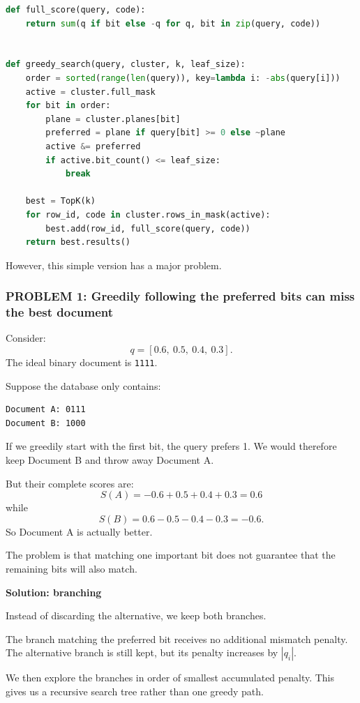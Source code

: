 \begin{minipage}{\linewidth}
\begin{lstlisting}[language=Python]
def full_score(query, code):
    return sum(q if bit else -q for q, bit in zip(query, code))


def greedy_search(query, cluster, k, leaf_size):
    order = sorted(range(len(query)), key=lambda i: -abs(query[i]))
    active = cluster.full_mask
    for bit in order:
        plane = cluster.planes[bit]
        preferred = plane if query[bit] >= 0 else ~plane
        active &= preferred
        if active.bit_count() <= leaf_size:
            break

    best = TopK(k)
    for row_id, code in cluster.rows_in_mask(active):
        best.add(row_id, full_score(query, code))
    return best.results()
\end{lstlisting}
\end{minipage}

However, this simple version has a major problem.

\subsubsection*{PROBLEM 1: Greedily following the preferred bits can miss the best document}
Consider:
\[
q=[0.6,\ 0.5,\ 0.4,\ 0.3].
\]
The ideal binary document is \texttt{1111}.

Suppose the database only contains:
\begin{verbatim}
Document A: 0111
Document B: 1000
\end{verbatim}
If we greedily start with the first bit, the query prefers 1. We would therefore keep
Document B and throw away Document A.

But their complete scores are:
\[
S(A)=-0.6+0.5+0.4+0.3=0.6
\]
while
\[
S(B)=0.6-0.5-0.4-0.3=-0.6.
\]
So Document A is actually better.

The problem is that matching one important bit does not guarantee that the remaining bits
will also match.

\textbf{Solution: branching}\par
Instead of discarding the alternative, we keep both branches.

The branch matching the preferred bit receives no additional mismatch penalty. The alternative
branch is still kept, but its penalty increases by $|q_i|$.

We then explore the branches in order of smallest accumulated penalty. This gives us a
recursive search tree rather than one greedy path.

